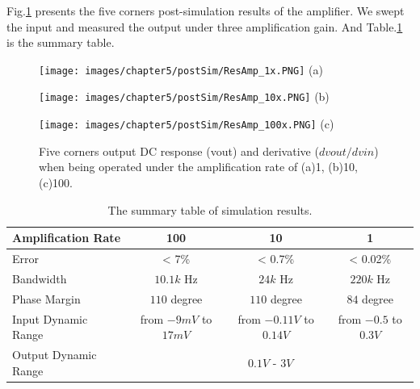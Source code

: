 {

Fig.\ref{fig:sim:ResAmp} presents the five corners post-simulation results of the amplifier.
We swept the input and measured the output under three amplification gain.
And Table.\ref{tb:sim:ResAmp} is the summary table.


\begin{figure}[!htb]
    \begin{minipage}[t]{1\textwidth}
        \centering
        \texttt{[image: images/chapter5/postSim/ResAmp\_1x.PNG]}
        (a)
    \end{minipage}
    \hspace{8cm}
    \begin{minipage}[t]{1\textwidth}
        \centering
        \texttt{[image: images/chapter5/postSim/ResAmp\_10x.PNG]}
        (b)
    \end{minipage}
    \begin{minipage}[t]{1\textwidth}
        \centering
        \texttt{[image: images/chapter5/postSim/ResAmp\_100x.PNG]}
        (c)
    \end{minipage}
    \caption{Five corners output DC response (vout) and derivative ($dvout/dvin$) when being operated under the amplification rate of (a)1, (b)10, (c)100.}
    \label{fig:sim:ResAmp}
\end{figure}


\begin{table}[!htb]
    {\fontfamily{}\fontsize{10}{14}\selectfont
    \centering
    \begin{tabular}{l|c|c|c}
        Amplification Rate & 100 & 10 & 1\\
        \hline
        Error & < 7\% & < 0.7\% & < 0.02\% \\
        \hline
        Bandwidth & $10.1k$ Hz & $24k$ Hz & $220k$ Hz\\
        \hline
        Phase Margin & $110$ degree & $110$ degree & $84$ degree \\
        \hline
        Input Dynamic Range & from $-9mV$ to $17mV$ & from $-0.11V$ to $0.14V$ & from $-0.5$ to $0.3V$\\
        \hline
        Output Dynamic Range & \multicolumn{3}{c}{$0.1V$ - $3V$}\\
    \end{tabular}
    \caption{The summary table of simulation results.}
    \label{tb:sim:ResAmp}
    }
\end{table}

}
